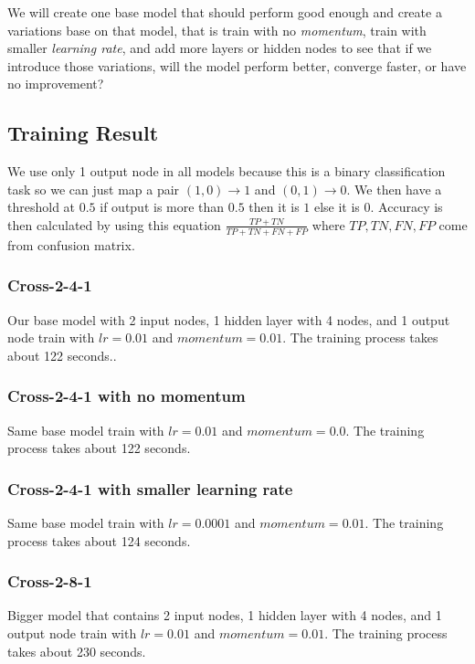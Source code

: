 \documentclass{article}
\begin{document}
We will create one base model that should perform good enough 
and create a variations base on that model, that is train 
with no \emph{momentum}, train with smaller \emph{learning rate}, 
and add more layers or hidden nodes to see that if we introduce 
those variations, will the model perform better, converge faster, or have no improvement?

\subsection*{Training Result}
We use only 1 output node in all models because this is a binary classification task so we can just map a pair $(1, 0) \rightarrow 1$ and $(0, 1) \rightarrow 0$.
We then have a threshold at $0.5$ if output is more than $0.5$ then it is $1$ else it is $0$.
Accuracy is then calculated by using this equation $\frac{TP+TN}{TP+TN+FN+FP}$ where $TP, TN, FN, FP$ come from confusion matrix.
\subsubsection*{Cross-2-4-1}
Our base model with 2 input nodes, 1 hidden layer with 4 nodes, and 1 output node train with $lr = 0.01$ and $momentum = 0.01$. 
The training process takes about 122 seconds..
\subsubsection*{Cross-2-4-1 with no momentum}
Same base model train with $lr = 0.01$ and $momentum = 0.0$.
The training process takes about 122 seconds.
\subsubsection*{Cross-2-4-1 with smaller learning rate}
Same base model train with $lr = 0.0001$ and $momentum = 0.01$.
The training process takes about 124 seconds.
\subsubsection*{Cross-2-8-1}
Bigger model that contains 2 input nodes, 1 hidden layer with 4 nodes, and 1 output node train with $lr = 0.01$ and $momentum = 0.01$.
The training process takes about 230 seconds.
\end{document}
